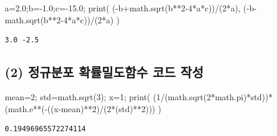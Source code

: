 \documentclass[
  letterpaper,
  DIV=11,
  numbers=noendperiod]{scrreprt}
\newenvironment{Shaded}{\begin{snugshade}}{\end{snugshade}}
\newcommand{\BuiltInTok}[1]{\textcolor[rgb]{0.00,0.23,0.31}{#1}}
\newcommand{\DecValTok}[1]{\textcolor[rgb]{0.68,0.00,0.00}{#1}}
\newcommand{\FloatTok}[1]{\textcolor[rgb]{0.68,0.00,0.00}{#1}}
\newcommand{\NormalTok}[1]{\textcolor[rgb]{0.00,0.23,0.31}{#1}}
\newcommand{\OperatorTok}[1]{\textcolor[rgb]{0.37,0.37,0.37}{#1}}
\begin{document}
\begin{Shaded}
\begin{Highlighting}[]
\NormalTok{a}\OperatorTok{=}\FloatTok{2.0}\OperatorTok{;}\NormalTok{b}\OperatorTok{={-}}\FloatTok{1.0}\OperatorTok{;}\NormalTok{c}\OperatorTok{={-}}\FloatTok{15.0}\OperatorTok{;}
\BuiltInTok{print}\NormalTok{(}
\NormalTok{    (}\OperatorTok{{-}}\NormalTok{b}\OperatorTok{+}\NormalTok{math.sqrt(b}\OperatorTok{**}\DecValTok{2}\OperatorTok{{-}}\DecValTok{4}\OperatorTok{*}\NormalTok{a}\OperatorTok{*}\NormalTok{c))}\OperatorTok{/}\NormalTok{(}\DecValTok{2}\OperatorTok{*}\NormalTok{a),}
\NormalTok{    (}\OperatorTok{{-}}\NormalTok{b}\OperatorTok{{-}}\NormalTok{math.sqrt(b}\OperatorTok{**}\DecValTok{2}\OperatorTok{{-}}\DecValTok{4}\OperatorTok{*}\NormalTok{a}\OperatorTok{*}\NormalTok{c))}\OperatorTok{/}\NormalTok{(}\DecValTok{2}\OperatorTok{*}\NormalTok{a)}
\NormalTok{)}
\end{Highlighting}
\end{Shaded}

\begin{verbatim}
3.0 -2.5
\end{verbatim}

\subsection*{(2) 정규분포 확률밀도함수 코드
작성}\label{uxc815uxaddcuxbd84uxd3ec-uxd655uxb960uxbc00uxb3c4uxd568uxc218-uxcf54uxb4dc-uxc791uxc131}

\begin{Shaded}
\begin{Highlighting}[]
\NormalTok{mean}\OperatorTok{=}\DecValTok{2}\OperatorTok{;}\NormalTok{ std}\OperatorTok{=}\NormalTok{math.sqrt(}\DecValTok{3}\NormalTok{)}\OperatorTok{;}\NormalTok{ x}\OperatorTok{=}\DecValTok{1}\OperatorTok{;}
\BuiltInTok{print}\NormalTok{(}
\NormalTok{    (}\DecValTok{1}\OperatorTok{/}\NormalTok{(math.sqrt(}\DecValTok{2}\OperatorTok{*}\NormalTok{math.pi)}\OperatorTok{*}\NormalTok{std))}\OperatorTok{*}\NormalTok{(math.e}\OperatorTok{**}\NormalTok{(}\OperatorTok{{-}}\NormalTok{((x}\OperatorTok{{-}}\NormalTok{mean)}\OperatorTok{**}\DecValTok{2}\NormalTok{)}\OperatorTok{/}\NormalTok{(}\DecValTok{2}\OperatorTok{*}\NormalTok{(std)}\OperatorTok{**}\DecValTok{2}\NormalTok{)))}
\NormalTok{)}
\end{Highlighting}
\end{Shaded}

\begin{verbatim}
0.19496965572274114
\end{verbatim}
\end{document}

